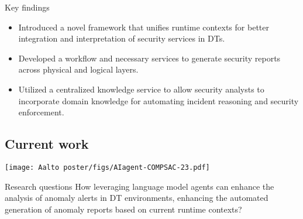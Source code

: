 \documentclass[landscape,a0,final]{a0poster} %
\begin{document}
\begin{minipage}{0.98\linewidth}
\begin{minipage}[t]{0.3\linewidth}
\begin{myframe}{Key findings}
\begin{itemize}
    \item Introduced a novel framework that unifies runtime contexts for better integration and interpretation of security services in DTs.
    \item Developed a workflow and necessary services to generate security reports across physical and logical layers.
    \item Utilized a centralized knowledge service to allow security analysts to incorporate domain knowledge for automating incident reasoning and security enforcement.
\end{itemize}
\end{myframe}

\subsection*{Current work}
\vspace{-20pt}
\begin{center}
    \texttt{[image: Aalto poster/figs/AIagent-COMPSAC-23.pdf]}
\end{center}
\begin{myframe}{Research questions}
  How leveraging language model agents can enhance the analysis of anomaly alerts in DT environments, enhancing the automated generation of anomaly reports based on current runtime contexts?
\end{myframe}

\end{minipage}
\end{minipage}
\end{document}
